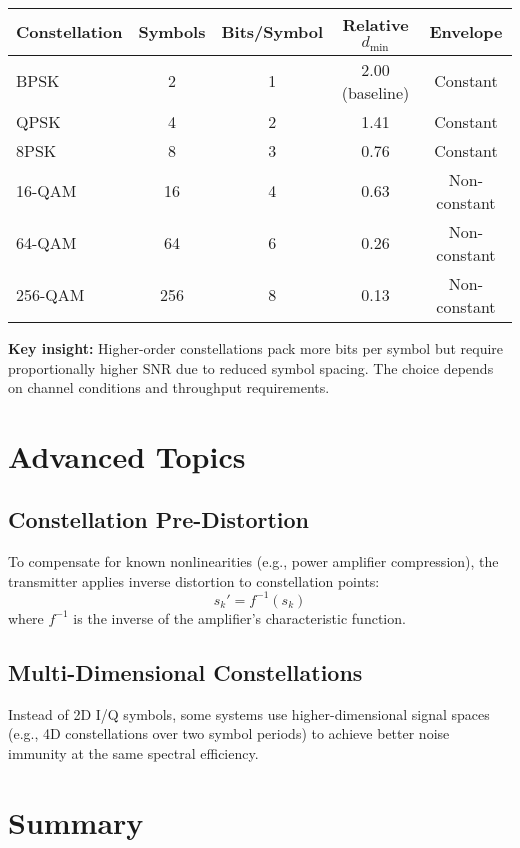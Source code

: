 \begin{center}
\begin{tabular}{@{}lcccc@{}}
\toprule
Constellation & Symbols & Bits/Symbol & Relative $d_{\min}$ & Envelope \\
\midrule
BPSK & 2 & 1 & 2.00 (baseline) & Constant \\
QPSK & 4 & 2 & 1.41 & Constant \\
8PSK & 8 & 3 & 0.76 & Constant \\
16-QAM & 16 & 4 & 0.63 & Non-constant \\
64-QAM & 64 & 6 & 0.26 & Non-constant \\
256-QAM & 256 & 8 & 0.13 & Non-constant \\
\bottomrule
\end{tabular}
\end{center}

\textbf{Key insight:} Higher-order constellations pack more bits per symbol but require proportionally higher SNR due to reduced symbol spacing. The choice depends on channel conditions and throughput requirements.

\section{Advanced Topics}

\subsection{Constellation Pre-Distortion}

To compensate for known nonlinearities (e.g., power amplifier compression), the transmitter applies inverse distortion to constellation points:
\begin{equation}
s_k' = f^{-1}(s_k)
\end{equation}
where $f^{-1}$ is the inverse of the amplifier's characteristic function.

\subsection{Multi-Dimensional Constellations}

Instead of 2D I/Q symbols, some systems use higher-dimensional signal spaces (e.g., 4D constellations over two symbol periods) to achieve better noise immunity at the same spectral efficiency.

\section{Summary}

